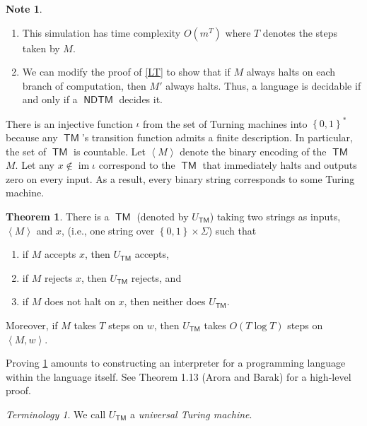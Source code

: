 \documentclass[10pt,letterpaper,cm]{nupset}
\theoremstyle{definition}
\newtheorem{note}[definition]{Note}
\theoremstyle{theorem}
\newtheorem{theorem}[definition]{Theorem}
\theoremstyle{remark}
\newtheorem*{term}{Terminology}
\newcommand{\1}{\mathbf{1}}
\newcommand{\0}{\vec 0}
\DeclareMathOperator{\im}{im}
\DeclareMathOperator{\TM}{\mathsf{TM}}
\DeclareMathOperator{\NDTM}{\mathsf{NDTM}}
\begin{document}
\begin{note} $ $
\begin{enumerate}
\item This simulation has time complexity $O\left(m^T\right)$ where $T$ denotes the steps taken by $M$.
\item We can modify the proof of \cref{LT} to show that if $M$ always halts on each branch of computation, then $M'$ always halts. Thus, a language is decidable if and only if a $\NDTM$ decides it.
\end{enumerate}
\end{note}

\medskip

There is an injective function $\iota$ from the set of Turning machines into $\left\{0,1\right\}^{\ast}$ because any $\TM$'s transition function admits a finite description. In particular, the set of $\TM$ is countable. Let $\left\langle M \right\rangle $ denote the binary encoding of the $\TM$ $M$. Let any $x\notin \im{\iota}$ correspond to the $\TM$ that immediately halts and outputs zero on every input. As a result, every binary string corresponds to some Turing machine. 

\smallskip

\begin{theorem}\label{UTM}
 There is a $\TM$ (denoted by $U_{\TM}$) taking two strings as inputs, $\left\langle M \right\rangle$ and $x$, (i.e., one string over $\left\{0,1\right\} \times \Sigma$) such that
 \begin{enumerate}[label=(\alph*)]
 \item if $M$ accepts $x$, then $U_{\TM}$ accepts,
 \item if $M$ rejects $x$, then $U_{\TM}$ rejects, and
 \item if $M$ does not halt on $x$, then neither does $U_{\TM}$.
 \end{enumerate} Moreover, if $M$ takes $T$ steps on $w$, then $U_{\TM}$ takes $O(T \log{T})$ steps on $\left\langle M, w \right\rangle$.
\end{theorem}

Proving \cref{UTM} amounts to constructing an interpreter for a programming language within the language itself. See Theorem 1.13 (Arora and Barak) for a high-level proof.

\begin{term}
We call $U_{\TM}$ a \textit{universal Turing machine}.
\end{term}

\medskip
\end{document}
